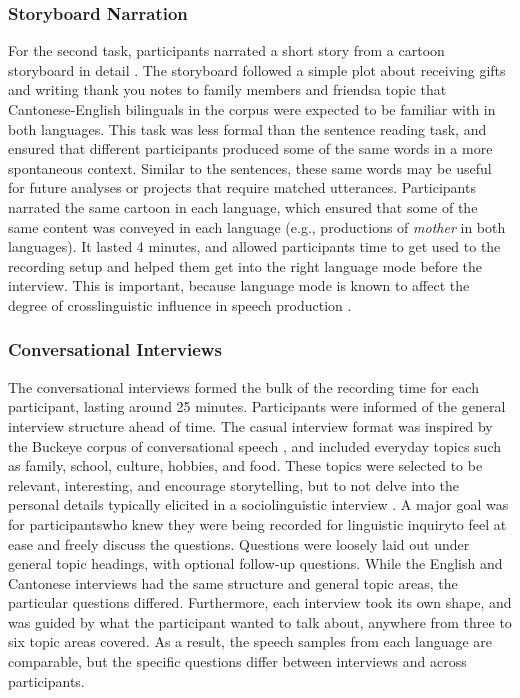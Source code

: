 \subsubsection{Storyboard Narration}\label{ch2:subsec:storyboard}
For the second task, participants narrated a short story from a cartoon storyboard in detail \citep{littell_2010_thank}. The storyboard followed a simple plot about receiving gifts and writing thank you notes to family members and friends\textemdash a topic that Cantonese-English bilinguals in the corpus were expected to be familiar with in both languages. This task was less formal than the sentence reading task, and ensured that different participants produced some of the same words in a more spontaneous context. Similar to the sentences, these same words may be useful for future analyses or projects that require matched utterances. Participants narrated the same cartoon in each language, which ensured that some of the same content was conveyed in each language (e.g., productions of \textit{mother} in both languages). It lasted 4 minutes, and allowed participants time to get used to the recording setup and helped them get into the right language mode before the interview. This is important, because language mode is known to affect the degree of crosslinguistic influence in speech production \citep{simonet_2019_convergence}.

\subsubsection{Conversational Interviews}\label{ch2:subsec:interview}
The conversational interviews formed the bulk of the recording time for each participant, lasting around 25 minutes. Participants were informed of the general interview structure ahead of time. The casual interview format was inspired by the Buckeye corpus of conversational speech \citep{pitt_2005_buckeye}, and included everyday topics such as family, school, culture, hobbies, and food. These topics were selected to be relevant, interesting, and encourage storytelling, but to not delve into the personal details typically elicited in a sociolinguistic interview \citep{nagy_2011_hlvc}. A major goal was for participants\textemdash who knew they were being recorded for linguistic inquiry\textemdash to feel at ease and freely discuss the questions. Questions were loosely laid out under general topic headings, with optional follow-up questions. While the English and Cantonese interviews had the same structure and general topic areas, the particular questions differed. Furthermore, each interview took its own shape, and was guided by what the participant wanted to talk about, anywhere from three to six topic areas covered. As a result, the speech samples from each language are comparable, but the specific questions differ between interviews and across participants. 

